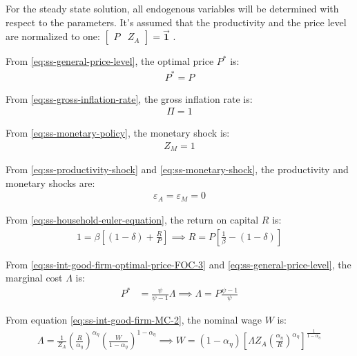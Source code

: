 \documentclass[
	12pt,
	]{article}
\numberwithin{equation}{section}
\theoremstyle{definition}
\theoremstyle{plain}
\theoremstyle{plain}
\theoremstyle{plain}
\begin{document}

For the steady state solution, all endogenous variables will be determined with respect to the parameters. It's assumed that the productivity and the price level are normalized to one: $\left[ \begin{smallmatrix} P & Z_A \end{smallmatrix} \right] = \vec{\bm{1}}$ \footnotemark{}. 

From \ref{eq:ss-general-price-level}, the optimal price $P^\ast$ is:
\begin{align}
	P^\ast = P
\end{align}

From \ref{eq:ss-gross-inflation-rate}, the gross inflation rate is:
\begin{align}
	\Pi = 1
\end{align}

From \ref{eq:ss-monetary-policy}, the monetary shock is:
\begin{align}
	Z_{M} = 1
\end{align}

From \ref{eq:ss-productivity-shock} and \ref{eq:ss-monetary-shock}, the productivity and monetary shocks are:
\begin{align}
	\varepsilon_{A} = \varepsilon_{M} = 0
\end{align}

From \ref{eq:ss-household-euler-equation}, the return on capital $R$ is:
\begin{align}
	\label{eq:ss-return-on-capital}
	1 = \beta \left[ (1-\delta) + \frac{R}{P} \right] \implies 
	R = P\left[ \frac{1}{\beta} - (1-\delta) \right]
\end{align}

From \ref{eq:ss-int-good-firm-optimal-price-FOC-3} and \ref{eq:ss-general-price-level}, the marginal cost $\Lambda$ is:
\begin{align}
	\label{eq:ss-marginal-cost}
	P^\ast &= \frac{\psi}{\psi-1} \Lambda \implies 
	\Lambda = P \frac{\psi-1}{\psi}
\end{align}

From equation \ref{eq:ss-int-good-firm-MC-2}, the nominal wage $W$ is:
\begin{align}
	\Lambda = \frac{1}{Z_{A}} \left( \frac{R}{\alpha_\eta} \right)^{\alpha_\eta} \left( \frac{W}{1-{\alpha_\eta}} \right)^{1-{\alpha_\eta}} \implies 
	W = (1-{\alpha_\eta}) \left[ \Lambda Z_{A} \left( \frac{\alpha_\eta}{R} \right)^{\alpha_\eta} \right]^\frac{1}{1-{\alpha_\eta}} 
	\label{eq:ss-nominal-wage}
\end{align}
\end{document}
